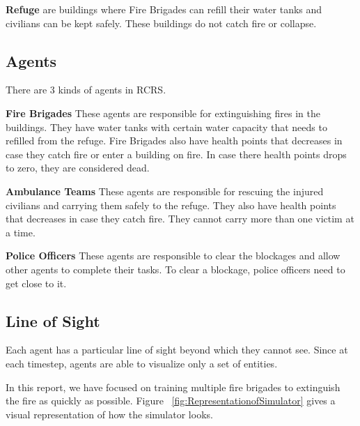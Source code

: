 \documentclass[12pt]{report}
\begin{document}
\textbf{Refuge} are buildings where Fire Brigades can refill their water tanks and civilians can be kept safely. These buildings do not catch fire or collapse. 

\subsection{Agents} There are 3 kinds of agents in RCRS. 

\textbf{Fire Brigades} These agents are responsible for extinguishing fires in the buildings. They have water tanks with certain water capacity that needs to refilled from the refuge. Fire Brigades also have health points that decreases in case they catch fire or enter a building on fire. In case there health points drops to zero, they are considered dead. 

\textbf{Ambulance Teams} These agents are responsible for rescuing the injured civilians and carrying them safely to the refuge. They also have health points that decreases in case they catch fire. They cannot carry more than one victim at a time. 

\textbf{Police Officers} These agents are responsible to clear the blockages and allow other agents to complete their tasks. To clear a blockage, police officers need to get close to it. 

\subsection{Line of Sight} Each agent has a particular line of sight beyond which they cannot see. Since at each timestep, agents are able to visualize only a set of entities.

\hfill

In this report, we have focused on training multiple fire brigades to extinguish the fire as quickly as possible. Figure ~\ref{fig:RepresentationofSimulator} gives a visual representation of how the simulator looks. 
\end{document}
